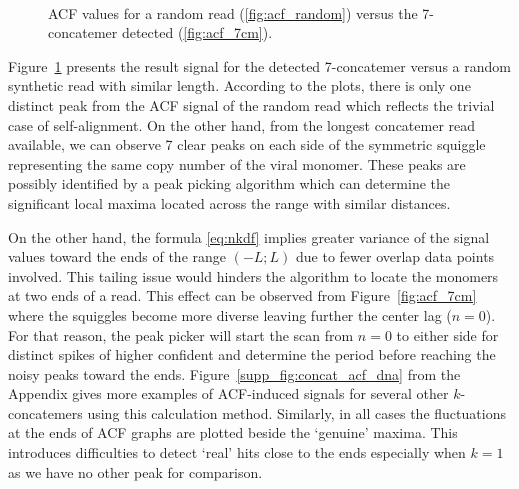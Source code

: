 \begin{figure}[!ht]
\centering
{}
~
\caption[ACF values for a random read versus the 7-concatemer detected]{ACF values for a random read (\ref{fig:acf_random}) versus the 7-concatemer detected (\ref{fig:acf_7cm}).}
\label{fig:concat_acf_dna}
\end{figure}

Figure~\ref{fig:concat_acf_dna} presents the result signal for the detected 7-concatemer versus a random synthetic read with similar length.
According to the plots, there is only one distinct peak from the ACF signal of the random read which reflects the trivial case of self-alignment. On the other hand, from the longest concatemer read available, we can observe 7 clear peaks on each side of the symmetric squiggle representing the same copy number of the viral monomer.
These peaks are possibly identified by a peak picking algorithm which can determine the significant local maxima located across the range with similar distances. 

On the other hand, the formula \ref{eq:nkdf} implies greater variance of the signal values toward the ends of the range $(-L;L)$ due to fewer overlap data points involved. This tailing issue would hinders the algorithm to locate the monomers at two ends of a read. This effect can be observed from Figure~\ref{fig:acf_7cm} where the squiggles become more diverse leaving further the center lag ($n=0$).
For that reason, the peak picker will start the scan from $n=0$ to either side for distinct spikes of higher confident and determine the period before reaching the noisy peaks toward the ends.
Figure~\ref{supp_fig:concat_acf_dna} from the Appendix gives more examples of ACF-induced signals for several other $k$-concatemers using this calculation method. Similarly,  in all cases the fluctuations at the ends of ACF graphs are plotted beside the `genuine' maxima. This introduces difficulties to detect `real' hits close to the ends especially when $k=1$ as we have no other peak for comparison.

